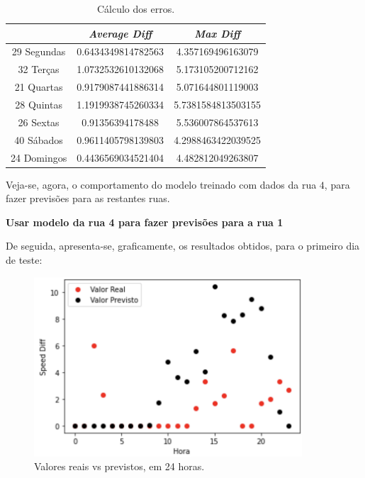 \documentclass[a4paper, 12pt]{article}
\begin{document}
\begin{table}[H]
	\centering
	\begin{tabular}{||c||c|c||}
		\hline\hline
		& \textit{Average Diff} & \textit{Max Diff} \\
		\hline\hline
		29 Segundas & 
0.6434349814782563
 & 4.357169496163079\\
		\hline
		32 Terças  &
1.0732532610132068
 & 5.173105200712162 \\
		\hline
		21 Quartas & 
0.9179087441886314
 & 5.071644801119003 \\
		\hline
		28 Quintas  & 
1.1919938745260334
 & 5.7381584813503155 \\
		\hline
		26 Sextas & 0.91356394178488
 & 5.536007864537613 \\
		\hline
		40 Sábados  & 0.9611405798139803
& 4.2988463422039525 \\
		\hline
		24 Domingos & 
0.4436569034521404
 & 4.482812049263807
 \\
		\hline\hline
	\end{tabular}
	\label{table:rua4}
	\caption{Cálculo dos erros.}
\end{table}

Veja-se, agora, o comportamento do modelo treinado com dados da rua $4$, para fazer previsões para as restantes ruas.

\vspace{0.5cm}
\textbf{Usar modelo da rua 4 para fazer previsões para a rua 1}

De seguida, apresenta-se, graficamente, os resultados obtidos, para o primeiro dia de teste:

\begin{figure}[H]
	\centering
	\includegraphics[width=10cm]{resultados/real_prev_mod4_rua1.png}
	\caption{Valores reais vs previstos, em 24 horas.}
\end{figure}
\end{document}
